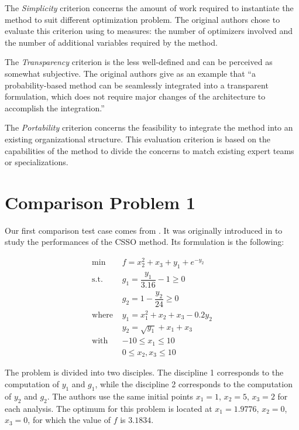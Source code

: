 The \emph{Simplicity} criterion concerns the amount of work required to instantiate the method to suit different optimization problem. The original authors chose to evaluate this criterion using to measures: the number of optimizers involved and the number of additional variables required by the method.

The \emph{Transparency} criterion is the less well-defined and can be perceived as somewhat subjective. The original authors give as an example that \enquote{a probability-based method can be seamlessly integrated into a transparent formulation, which does not require major changes of the architecture to accomplish the integration.}

The \emph{Portability} criterion concerns the feasibility to integrate the method into an existing organizational structure. This evaluation criterion is based on the capabilities of the method to divide the concerns to match existing expert teams or specializations.

\section{Comparison Problem 1}

Our first comparison test case comes from \cite{perez2004evaluation}. It was originally introduced in \cite{sellar1996response} to study the performances of the CSSO method. Its formulation is the following:

\begin{align*}
\text{min }		&	f =x_2^2 + x_3 + y_1 + e^{-y_2}\\
\text{s.t. }			&	g_1 = \dfrac{y_1}{3.16} - 1 \geq 0\\ 
							&	g_2 = 1 - \dfrac{y_2}{24} \geq 0\\
\text{where }	&	y_1 = x_1^2 + x_2 + x_3 - 0.2y_2\\
							&	y_2 = \sqrt{y_1} + x_1 + x_3\\
\text{with }		& -10 \leq x_1 \leq 10\\
							& 0 \leq x_2, x_3 \leq 10
\end{align*}

The problem is divided into two disciples. The discipline 1 corresponds to the computation of $y_1$ and $g_1$, while the discipline 2 corresponds to the computation of  $y_2$ and $g_2$. The authors use the same initial points $x_1 = 1$, $x_2 = 5$, $x_3 = 2$ for each analysis. The optimum for this problem is located at $x_1 = 1.9776$, $x_2 = 0$, $x_3 = 0$, for which the value of $f$ is $3.1834$.

